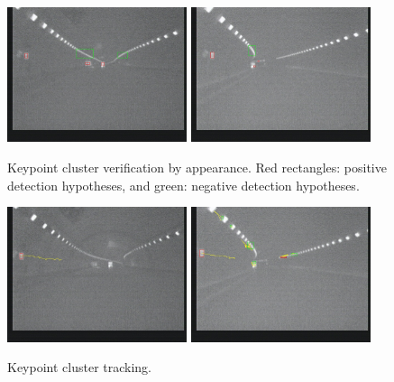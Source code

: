 \begin{figure}[b]
\includegraphics[width=0.47\textwidth,bb=0 0 640 480]{VeriRgsimg00634.jpg}
\includegraphics[width=0.47\textwidth,bb=0 0 640 480]{VeriRgsimg01075.jpg}
\caption[Keypoint cluster verification by appearance]{Keypoint cluster verification by appearance. Red rectangles: positive detection hypotheses, and green: negative detection hypotheses.}
\label{ex1:four}
\end{figure}

\begin{figure}
{
\includegraphics[width=0.47\textwidth,bb=0 0 640 480]{Trjimg00469.jpg}
}
{
\includegraphics[width=0.47\textwidth,bb=0 0 640 480]{Trjimg01080.jpg}
}
\caption[Keypoint cluster tracking]{Keypoint cluster tracking.}
\label{ex1:five}
\end{figure}

